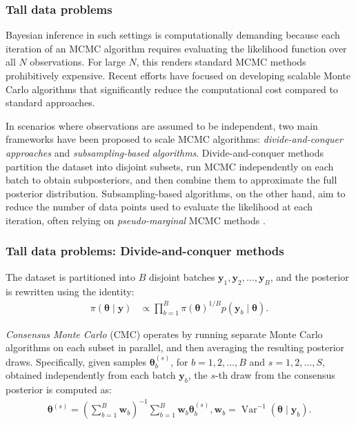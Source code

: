 \documentclass[12pt, compress]{beamer}
\begin{document}
\begin{frame}
	\frametitle{Tall data problems}
Bayesian inference in such settings is computationally demanding because each iteration of an MCMC algorithm requires evaluating the likelihood function over all \( N \) observations. For large \( N \), this renders standard MCMC methods prohibitively expensive. Recent efforts have focused on developing scalable Monte Carlo algorithms that significantly reduce the computational cost compared to standard approaches.

In scenarios where observations are assumed to be independent, two main frameworks have been proposed to scale MCMC algorithms: \textit{divide-and-conquer approaches} and \textit{subsampling-based algorithms}. Divide-and-conquer methods partition the dataset into disjoint subsets, run MCMC independently on each batch to obtain subposteriors, and then combine them to approximate the full posterior distribution. Subsampling-based algorithms, on the other hand, aim to reduce the number of data points used to evaluate the likelihood at each iteration, often relying on \textit{pseudo-marginal} MCMC methods \cite{andrieu2009pseudoefficient}.

\end{frame}

\begin{frame}
	\frametitle{Tall data problems: Divide-and-conquer methods}
The dataset is partitioned into \( B \) disjoint batches \( \mathbf{y}_1, \mathbf{y}_2, \dots, \mathbf{y}_B \), and the posterior is rewritten using the identity:
\begin{align*}
	\pi(\boldsymbol{\theta} \mid \mathbf{y}) &\propto \prod_{b=1}^B \pi(\boldsymbol{\theta})^{1/B} p(\mathbf{y}_b \mid \boldsymbol{\theta}).
\end{align*}

\textit{Consensus Monte Carlo} (CMC) operates by running separate Monte Carlo algorithms on each subset in parallel, and then averaging the resulting posterior draws. Specifically, given samples \( \boldsymbol{\theta}_b^{(s)} \), for  \( b = 1, 2, \dots, B \) and \( s = 1, 2, \dots, S \), obtained independently from each batch \( \mathbf{y}_b \), the \( s \)-th draw from the consensus posterior is computed as:
\begin{align*}
	\boldsymbol{\theta}^{(s)} = \left( \sum_{b=1}^B \mathbf{w}_b \right)^{-1} \sum_{b=1}^B \mathbf{w}_b \boldsymbol{\theta}_b^{(s)}, \mathbf{w}_b = \operatorname{Var}^{-1}(\boldsymbol{\theta} \mid \mathbf{y}_b).
\end{align*}
\end{frame}
\end{document}
